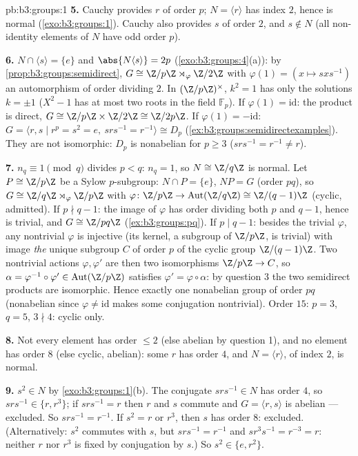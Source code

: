 \begin{solution}{pb:b3:groups:1}
\textbf{5.} Cauchy provides $r$ of order $p$; $N = \langle r
\rangle$ has index $2$, hence is normal (\cref{exo:b3:groups:1}).
Cauchy also provides $s$ of order $2$, and $s \notin N$ (all
non-identity elements of $N$ have odd order $p$).

\textbf{6.} $N \cap \langle s \rangle = \{e\}$ and $\abs{N\langle
s\rangle} = 2p$ (\cref{exo:b3:groups:4}(a)): by
\cref{prop:b3:groups:semidirect}, $G \cong \Z/p\Z \rtimes_\varphi
\Z/2\Z$ with $\varphi(1) = (x \mapsto sxs^{-1})$ an automorphism
of order dividing $2$. In $(\Z/p\Z)^\times$, $k^2 = 1$ has only
the solutions $k = \pm 1$ ($X^2 - 1$ has at most two roots in the
field $\mathbb F_p$). If $\varphi(1) = \mathrm{id}$: the product
is direct, $G \cong \Z/p\Z \times \Z/2\Z \cong \Z/2p\Z$. If
$\varphi(1) = -\mathrm{id}$: $G = \langle r, s \mid r^p = s^2 = e,
\ srs^{-1} = r^{-1}\rangle \cong D_p$
(\cref{ex:b3:groups:semidirectexamples}). They are not isomorphic:
$D_p$ is nonabelian for $p \geq 3$ ($srs^{-1} = r^{-1} \neq r$).

\textbf{7.} $n_q \equiv 1 \pmod q$ divides $p < q$: $n_q = 1$, so
$N \cong \Z/q\Z$ is normal. Let $P \cong \Z/p\Z$ be a Sylow
$p$-subgroup: $N \cap P = \{e\}$, $NP = G$ (order $pq$), so $G
\cong \Z/q\Z \rtimes_\varphi \Z/p\Z$ with $\varphi \colon \Z/p\Z
\to \operatorname{Aut}(\Z/q\Z) \cong \Z/(q-1)\Z$ (cyclic,
admitted). If $p \nmid q - 1$: the image of $\varphi$ has order
dividing both $p$ and $q-1$, hence is trivial, and $G \cong
\Z/pq\Z$ (\cref{ex:b3:groups:pq}). If $p \mid q - 1$: besides the
trivial $\varphi$, any nontrivial $\varphi$ is injective (its
kernel, a subgroup of $\Z/p\Z$, is trivial) with image \emph{the}
unique subgroup $C$ of order $p$ of the cyclic group
$\Z/(q-1)\Z$. Two nontrivial actions $\varphi, \varphi'$ are then
two isomorphisms $\Z/p\Z \to C$, so $\alpha =
\varphi^{-1}\circ\varphi' \in \operatorname{Aut}(\Z/p\Z)$
satisfies $\varphi' = \varphi\circ\alpha$: by question 3 the two
semidirect products are isomorphic. Hence exactly one nonabelian
group of order $pq$ (nonabelian since $\varphi \neq
\mathrm{id}$ makes some conjugation nontrivial). Order $15$: $p =
3$, $q = 5$, $3 \nmid 4$: cyclic only.

\textbf{8.} Not every element has order $\leq 2$ (else abelian by
question 1), and no element has order $8$ (else cyclic, abelian):
some $r$ has order $4$, and $N = \langle r\rangle$, of index $2$,
is normal.

\textbf{9.} $s^2 \in N$ by \cref{exo:b3:groups:1}(b). The
conjugate $srs^{-1} \in N$ has order $4$, so $srs^{-1} \in \{r,
r^3\}$; if $srs^{-1} = r$ then $r$ and $s$ commute and $G =
\langle r, s\rangle$ is abelian --- excluded. So $srs^{-1} =
r^{-1}$. If $s^2 = r$ or $r^3$, then $s$ has order $8$: excluded.
(Alternatively: $s^2$ commutes with $s$, but $s r s^{-1} =
r^{-1}$ and $s r^3 s^{-1} = r^{-3} = r$: neither $r$ nor $r^3$ is
fixed by conjugation by $s$.) So $s^2 \in \{e, r^2\}$.


\end{solution}
